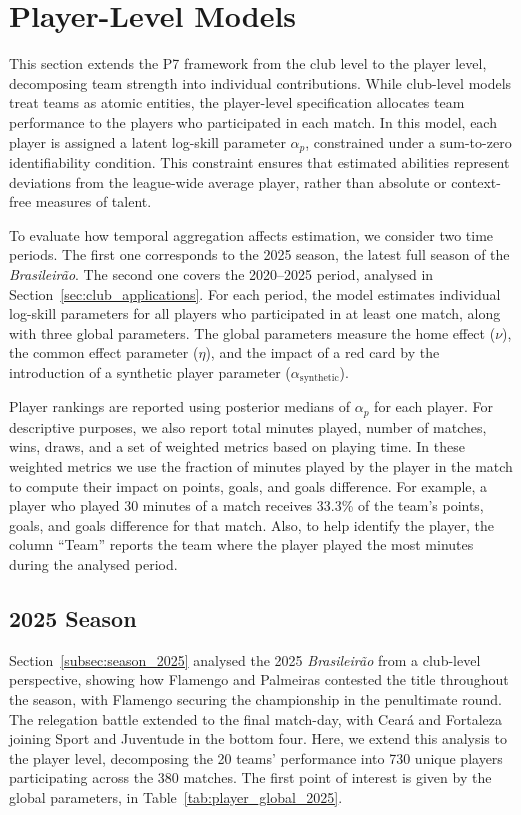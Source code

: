 \section{Player-Level Models}
\label{sec:player_level_models}

This section extends the P7 framework from the club level to the player level, decomposing team strength into individual contributions.
While club-level models treat teams as atomic entities, the player-level specification allocates team performance to the players who participated in each match.
In this model, each player is assigned a latent log-skill parameter $\alpha_p$, constrained under a sum-to-zero identifiability condition.
This constraint ensures that estimated abilities represent deviations from the league-wide average player, rather than absolute or context-free measures of talent.

To evaluate how temporal aggregation affects estimation, we consider two time periods.
The first one corresponds to the 2025 season, the latest full season of the \textit{Brasileirão}.
The second one covers the 2020--2025 period, analysed in Section~\ref{sec:club_applications}.
For each period, the model estimates individual log-skill parameters for all players who participated in at least one match, along with three global parameters.
The global parameters measure the home effect ($\nu$), the common effect parameter ($\eta$), and the impact of a red card by the introduction of a synthetic player parameter ($\alpha_{\text{synthetic}}$).

Player rankings are reported using posterior medians of $\alpha_p$ for each player.
For descriptive purposes, we also report total minutes played, number of matches, wins, draws, and a set of weighted metrics based on playing time.
In these weighted metrics we use the fraction of minutes played by the player in the match to compute their impact on points, goals, and goals difference.
For example, a player who played 30 minutes of a match receives 33.3\% of the team's points, goals, and goals difference for that match.
Also, to help identify the player, the column ``Team'' reports the team where the player played the most minutes during the analysed period.

\subsection{2025 Season}
\label{subsec:player_2025}

Section~\ref{subsec:season_2025} analysed the 2025 \textit{Brasileirão} from a club-level perspective, showing how Flamengo and Palmeiras contested the title throughout the season, with Flamengo securing the championship in the penultimate round.
The relegation battle extended to the final match-day, with Ceará and Fortaleza joining Sport and Juventude in the bottom four.
Here, we extend this analysis to the player level, decomposing the 20 teams' performance into 730 unique players participating across the 380 matches.
The first point of interest is given by the global parameters, in Table~\ref{tab:player_global_2025}.

